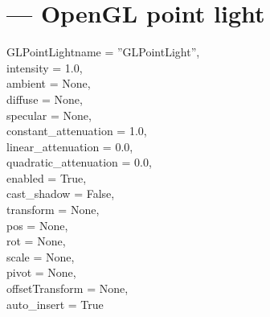 
\section{ ---
         OpenGL point light}

\begin{classdesc}{GLPointLight}{name = ''GLPointLight'',\\ 
                       intensity = 1.0,\\
                       ambient = None,\\
                       diffuse = None,\\
                       specular = None,\\
                       constant_attenuation = 1.0,\\
                       linear_attenuation = 0.0,\\
                       quadratic_attenuation = 0.0,\\
                       enabled = True,\\
                       cast_shadow = False,\\
                       transform = None,\\
                       pos = None,\\
                       rot = None,\\
                       scale = None,\\
                       pivot = None,\\
                       offsetTransform = None,\\
                       auto_insert = True}

\end{classdesc}


